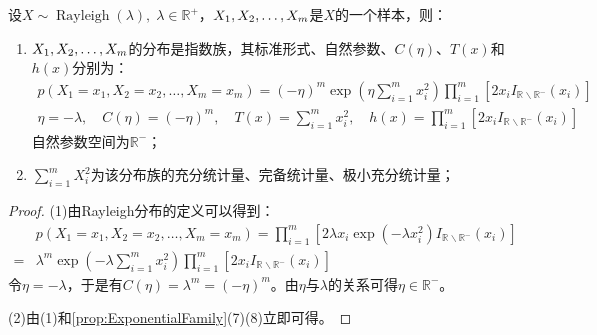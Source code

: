 \begin{theorem}
	设$X\sim\operatorname{Rayleigh}(\lambda),\;\lambda\in\mathbb{R}^{+}$，$X_1, X_2, \dots, X_{m}$是$X$的一个样本，则：
	\begin{enumerate}
		\item $X_1, X_2, \dots, X_{m}$的分布是指数族，其标准形式、自然参数、$C(\eta)$、$T(x)$和$h(x)$分别为：
		\begin{gather*}
			p(X_1=x_1,X_2=x_2,\dots,X_m=x_m) =(-\eta)^m\exp\left(\eta\sum_{i=1}^{m}x_i^2\right)\prod_{i=1}^{m}\left[2x_iI_{\mathbb{R}^{}\backslash\mathbb{R}^{-}}(x_i)\right] \\
			\eta=-\lambda,\quad C(\eta)=(-\eta)^m,\quad
			T(x)=\sum_{i=1}^{m}x_i^2,\quad h(x)=\prod_{i=1}^{m}\left[2x_iI_{\mathbb{R}^{}\backslash\mathbb{R}^{-}}(x_i)\right]
		\end{gather*}
		自然参数空间为$\mathbb{R}^{-}$；
		\item $\sum\limits_{i=1}^{m}X_i^2$为该分布族的充分统计量、完备统计量、极小充分统计量；
	\end{enumerate}
\end{theorem}
\begin{proof}
	(1)由Rayleigh分布的定义可以得到：
	\begin{align*}
		&p(X_1=x_1,X_2=x_2,\dots,X_m=x_m)=\prod_{i=1}^{m}\left[2\lambda x_i\exp(-\lambda x_i^2)I_{\mathbb{R}^{}\backslash\mathbb{R}^{-}}(x_i)\right] \\
		=&\lambda^m\exp\left(-\lambda\sum_{i=1}^{m}x_i^2\right)\prod_{i=1}^{m}\left[2x_iI_{\mathbb{R}^{}\backslash\mathbb{R}^{-}}(x_i)\right]
	\end{align*}
	令$\eta=-\lambda$，于是有$C(\eta)=\lambda^{m}=(-\eta)^m$。由$\eta$与$\lambda$的关系可得$\eta\in\mathbb{R}^{-}$。\par
	(2)由(1)和\cref{prop:ExponentialFamily}(7)(8)立即可得。
\end{proof}

